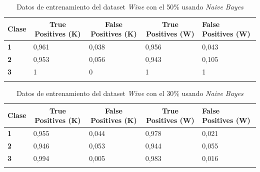 \documentclass[10pt,a4paper]{article}
\begin{document}
\begin{table}[h!]
	\begin{tabular}{lllll}
		\hline
		\multicolumn{1}{|c|}{\textbf{Clase}} & \multicolumn{1}{c|}{\textbf{True Positives (K)}} & \multicolumn{1}{c|}{\textbf{False Positives (K)}} & \multicolumn{1}{c|}{\textbf{True Positives (W)}} & \multicolumn{1}{l|}{\textbf{False Positives (W)}} \\ \hline
		\multicolumn{1}{|l|}{\textbf{1}} & \multicolumn{1}{l|}{0,961}          & \multicolumn{1}{l|}{0,038}          & \multicolumn{1}{l|}{0,956}          & \multicolumn{1}{l|}{0,043} \\ \hline
		\multicolumn{1}{|l|}{\textbf{2}} & \multicolumn{1}{l|}{0,953}          & \multicolumn{1}{l|}{0,056}          & \multicolumn{1}{l|}{0,943}          & \multicolumn{1}{l|}{0,105} \\ \hline
		\multicolumn{1}{|l|}{\textbf{3}} & \multicolumn{1}{l|}{1}          & \multicolumn{1}{l|}{0}          & \multicolumn{1}{l|}{1}          & \multicolumn{1}{l|}{1}\\ \hline
		\textbf{}                       &                                &                                &                                &                      
		
	\end{tabular}
	\caption{Datos de entrenamiento del dataset \emph{Wine} con el 50\% usando \emph{Naive Bayes}}
	\label{tab:wine_bayes_50}
\end{table}


\begin{table}[h!]
	\begin{tabular}{lllll}
		\hline
		\multicolumn{1}{|c|}{\textbf{Clase}} & \multicolumn{1}{c|}{\textbf{True Positives (K)}} & \multicolumn{1}{c|}{\textbf{False Positives (K)}} & \multicolumn{1}{c|}{\textbf{True Positives (W)}} & \multicolumn{1}{l|}{\textbf{False Positives (W)}} \\ \hline
		\multicolumn{1}{|l|}{\textbf{1}} & \multicolumn{1}{l|}{0,955}          & \multicolumn{1}{l|}{0,044}          & \multicolumn{1}{l|}{0,978}          & \multicolumn{1}{l|}{0,021} \\ \hline
		\multicolumn{1}{|l|}{\textbf{2}} & \multicolumn{1}{l|}{0,946}          & \multicolumn{1}{l|}{0,053}          & \multicolumn{1}{l|}{0,944}          & \multicolumn{1}{l|}{0,055} \\ \hline
		\multicolumn{1}{|l|}{\textbf{3}} & \multicolumn{1}{l|}{0,994}          & \multicolumn{1}{l|}{0,005}          & \multicolumn{1}{l|}{0,983}          & \multicolumn{1}{l|}{0,016}\\ \hline
		\textbf{}                       &                                &                                &                                &                      
		
	\end{tabular}
	\caption{Datos de entrenamiento del dataset \emph{Wine} con el 30\% usando \emph{Naive Bayes}}
	\label{tab:wine_bayes_30}
\end{table}
\newpage
\end{document}
